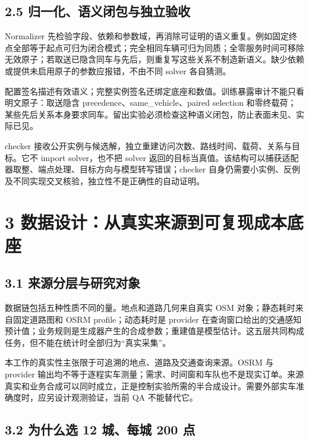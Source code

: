 \documentclass[UTF8,10pt,a4paper,fontset=fandol]{ctexart}
\begin{document}
\subsection*{2.5 归一化、语义闭包与独立验收}


Normalizer 先检验字段、依赖和参数域，再消除可证明的语义重复。例如固定终点全部等于起点可归为闭合模式；完全相同车辆可归为同质；全零服务时间可移除无效原子；若取送已隐含同车与先后，则重复写这些关系不制造新语义。缺少依赖或提供未启用原子的参数应报错，不由不同 solver 各自猜测。


配置签名描述有效语义；完整实例签名还绑定底座和数值。训练暴露审计不能只看明文原子：取送隐含 precedence、same\_\allowbreak{}vehicle、paired selection 和零终载荷；某些先后关系本身要求同车。留出实验必须检查这种语义闭包，防止表面未见、实际已见。


checker 接收公开实例与候选解，独立重建访问次数、路线时间、载荷、关系与目标。它不 import solver，也不把 solver 返回的目标当真值。该结构可以捕获适配器取整、端点处理、目标方向与模型转写错误；checker 自身仍需要小实例、反例及不同实现交叉核验，独立性不是正确性的自动证明。


\section*{3 数据设计：从真实来源到可复现成本底座}


\subsection*{3.1 来源分层与研究对象}


数据链包括五种性质不同的量。地点和道路几何来自真实 OSM 对象；静态耗时来自固定道路图和 OSRM profile；动态耗时是 provider 在查询窗口给出的交通感知预计值；业务规则是生成器产生的合成参数；重建值是模型估计。这五层共同构成任务，但不能在统计时全部归为“真实采集”。


本工作的真实性主张限于可追溯的地点、道路及交通查询来源。OSRM 与 provider 输出均不等于逐程实车测量；需求、时间窗和车队也不是现实订单。来源真实和业务合成可以同时成立，正是控制实验所需的半合成设计。需要外部实车准确度时，应另设计观测验证，当前 QA 不能替代它。


\subsection*{3.2 为什么选 12 城、每城 200 点}
\end{document}
